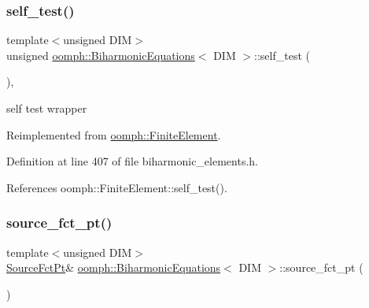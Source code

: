 \subsubsection{\texorpdfstring{self\+\_\+test()}{self\_test()}}
{\footnotesize\ttfamily template$<$unsigned D\+IM$>$ \\
unsigned \hyperlink{classoomph_1_1BiharmonicEquations}{oomph\+::\+Biharmonic\+Equations}$<$ D\+IM $>$\+::self\+\_\+test (\begin{DoxyParamCaption}{ }\end{DoxyParamCaption})\hspace{0.3cm}{\ttfamily [inline]}, {\ttfamily [virtual]}}



self test wrapper 



Reimplemented from \hyperlink{classoomph_1_1FiniteElement_af94c5a5e22175d5420b33b3b79e46ed3}{oomph\+::\+Finite\+Element}.



Definition at line 407 of file biharmonic\+\_\+elements.\+h.



References oomph\+::\+Finite\+Element\+::self\+\_\+test().

\mbox{\label{classoomph_1_1BiharmonicEquations_adc6fb5197bfb8635b43e3bdfcc91d676}} 
\subsubsection{\texorpdfstring{source\+\_\+fct\+\_\+pt()}{source\_fct\_pt()}\hspace{0.1cm}{\footnotesize\ttfamily [1/2]}}
{\footnotesize\ttfamily template$<$unsigned D\+IM$>$ \\
\hyperlink{classoomph_1_1BiharmonicEquations_aafa48cd7bbc8ce4383224d1d2d0bfda3}{Source\+Fct\+Pt}\& \hyperlink{classoomph_1_1BiharmonicEquations}{oomph\+::\+Biharmonic\+Equations}$<$ D\+IM $>$\+::source\+\_\+fct\+\_\+pt (\begin{DoxyParamCaption}{ }\end{DoxyParamCaption})\hspace{0.3cm}{\ttfamily [inline]}}




